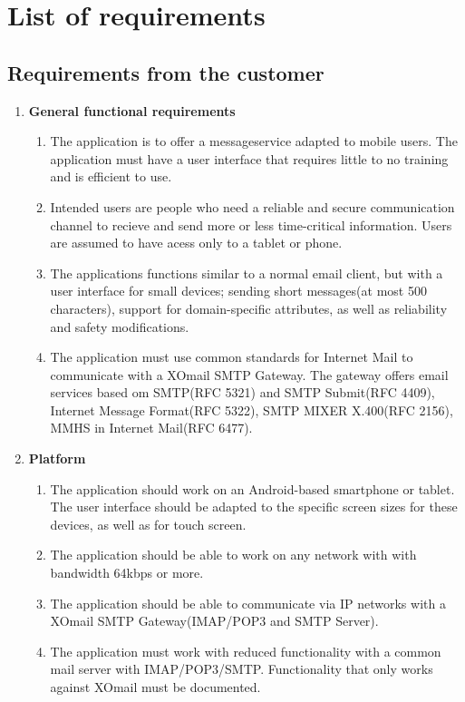 \chapter{List of requirements}

\section{Requirements from the customer}

\begin{enumerate}
\item{} \textbf{General functional requirements}
\begin{enumerate}
\item{}The application is to offer a messageservice adapted to mobile users. The application must have a user interface that requires little to no training and is efficient to use.
\item{}Intended users are people who need a reliable and secure communication channel to recieve and send more or less time-critical information. Users are assumed to have acess only to a tablet or phone.
\item{}The applications functions similar to a normal email client, but with a user interface for small devices; sending short messages(at most 500 characters), support for domain-specific attributes, as well as reliability and safety modifications.
\item{}The application must use common standards for Internet Mail to communicate with a XOmail SMTP Gateway. The gateway offers email services based om SMTP(RFC 5321) and SMTP Submit(RFC 4409), Internet Message Format(RFC 5322), SMTP MIXER X.400(RFC 2156), MMHS in Internet Mail(RFC 6477).
\end{enumerate}
\item{}\textbf{Platform}
\begin{enumerate}
\item{}The application should work on an Android-based smartphone or tablet. The user interface should be adapted to the specific screen sizes for these devices, as well as for touch screen.
\item{}The application should be able to work on any network with with bandwidth 64kbps or more.
\item{}The application should be able to communicate via IP networks with a XOmail SMTP Gateway(IMAP/POP3 and SMTP Server).
\item{}The application must work with reduced functionality with a common mail server with IMAP/POP3/SMTP. Functionality that only works against XOmail must be documented.

\end{enumerate}
\end{enumerate}

